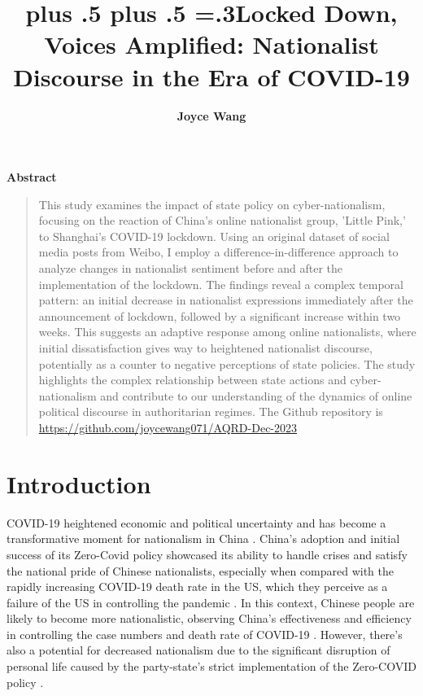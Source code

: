 \documentclass[12pt, ]{article}
\title{\sffamily\bfseries\huge\parfillskip=0pt
\rightskip=0pt plus .5\textwidth
\leftskip=0pt plus .5\textwidth
\emergencystretch=.3\textwidth Locked Down, Voices Amplified:
Nationalist Discourse in the Era of COVID-19}
\author{\textbf{Joyce Wang}
 }
\date{}
\renewenvironment{abstract}{
  \centerline
  {\large\sffamily\bfseries Abstract}\vspace{-1em}
  \begin{quote}\small
}{
  \end{quote}
}
\begin{document}
\allsectionsfont{\sffamily}

\maketitle

\begin{abstract}
This study examines the impact of state policy on cyber-nationalism, focusing on the reaction of China's online nationalist group, 'Little Pink,' to Shanghai's COVID-19 lockdown. Using an original dataset of social media posts from Weibo, I employ a difference-in-difference approach to analyze changes in nationalist sentiment before and after the implementation of the lockdown. The findings reveal a complex temporal pattern: an initial decrease in nationalist expressions immediately after the announcement of lockdown, followed by a significant increase within two weeks. This suggests an adaptive response among online nationalists, where initial dissatisfaction gives way to heightened nationalist discourse, potentially as a counter to negative perceptions of state policies. The study highlights the complex relationship between state actions and cyber-nationalism and contribute to our understanding of the dynamics of online political discourse in authoritarian regimes. The Github repository is \url{https://github.com/joycewang071/AQRD-Dec-2023} 

\end{abstract}

\ifdefined\Shaded\renewenvironment{Shaded}{\begin{tcolorbox}[enhanced, interior hidden, borderline west={3pt}{0pt}{shadecolor}, breakable, sharp corners, boxrule=0pt, frame hidden]}{\end{tcolorbox}}\fi




\hypertarget{introduction}{%
\section{Introduction}\label{introduction}}

COVID-19 heightened economic and political uncertainty and has become a transformative moment for nationalism in China \citep{woods2020covid}. China's adoption and initial success of its Zero-Covid policy showcased its ability to handle crises and satisfy the national pride of Chinese nationalists, especially when compared with the rapidly increasing COVID-19 death rate in the US, which they perceive as a failure of the US in controlling the pandemic \citep{wang2021crisis,woods2020covid}. In this context, Chinese people are likely to become more nationalistic, observing China's effectiveness and efficiency in controlling the case numbers and death rate of COVID-19 \citep{woods2020covid}. However, there's also a potential for decreased nationalism due to the significant disruption of personal life caused by the party-state’s strict implementation of the Zero-COVID policy \citep{wang2021crisis}.  
\end{document}
